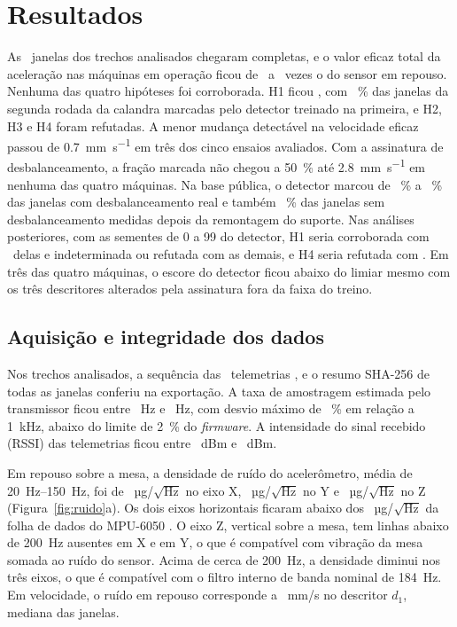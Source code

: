 \chapter{Resultados}\label{cap:resultados}

As \campoJanelas\ janelas dos trechos analisados chegaram completas, e o valor eficaz total da aceleração nas máquinas em operação ficou de \sinalRazaoMin\ a \sinalRazaoMax\ vezes o do sensor em repouso. Nenhuma das quatro hipóteses foi corroborada. H1 ficou \hUmVeredito, com \hUmFracaoCalandra~\% das janelas da segunda rodada da calandra marcadas pelo detector treinado na primeira, e H2, H3 e H4 foram refutadas. A menor mudança detectável na velocidade eficaz passou de \SI{0,7}{\milli\meter\per\second} em três dos cinco ensaios avaliados. Com a assinatura de desbalanceamento, a fração marcada não chegou a \SI{50}{\percent} até \SI{2,8}{\milli\meter\per\second} em nenhuma das quatro máquinas. Na base pública, o detector marcou de \hQuatroFracaoTres~\% a \hQuatroFracaoQuatro~\% das janelas com desbalanceamento real e também \hQuatroFracaoZero~\% das janelas sem desbalanceamento medidas depois da remontagem do suporte. Nas análises posteriores, com as sementes de 0 a \num{99} do detector, H1 seria corroborada com \apTresVereditoUmCorroborada\ delas e indeterminada ou refutada com as demais, e H4 seria refutada com \apTresVereditoQuatroRefutada. Em três das quatro máquinas, o escore do detector ficou abaixo do limiar mesmo com os três descritores alterados pela assinatura fora da faixa do treino.

\section{Aquisição e integridade dos dados}\label{sec:res-aquisicao}

Nos trechos analisados, a sequência das \campoLeituras\ telemetrias \campoLacunasTexto, e o resumo SHA-256 de todas as janelas conferiu na exportação. A taxa de amostragem estimada pelo transmissor ficou entre \campoTaxaMin~Hz e \campoTaxaMax~Hz, com desvio máximo de \campoDesvioTaxaMax~\% em relação a \SI{1}{\kilo\hertz}, abaixo do limite de \SI{2}{\percent} do \textit{firmware}. A intensidade do sinal recebido (RSSI) das telemetrias ficou entre \campoRssiMin~dBm e \campoRssiMax~dBm.

Em repouso sobre a mesa, a densidade de ruído do acelerômetro, média de \SIrange{20}{150}{\hertz}, foi de \ruidoDensidadeX~µg/$\sqrt{\text{Hz}}$ no eixo X, \ruidoDensidadeY~µg/$\sqrt{\text{Hz}}$ no Y e \ruidoDensidadeZ~µg/$\sqrt{\text{Hz}}$ no Z (Figura~\ref{fig:ruido}a). Os dois eixos horizontais ficaram abaixo dos \ruidoDatasheet~µg/$\sqrt{\text{Hz}}$ da folha de dados do MPU-6050 \cite{invensense2011ps}. O eixo Z, vertical sobre a mesa, tem linhas abaixo de \SI{200}{\hertz} ausentes em X e em Y, o que é compatível com vibração da mesa somada ao ruído do sensor. Acima de cerca de \SI{200}{\hertz}, a densidade diminui nos três eixos, o que é compatível com o filtro interno de banda nominal de \SI{184}{\hertz}. Em velocidade, o ruído em repouso corresponde a \ruidoVelocidade~mm/s no descritor $d_1$, mediana das janelas.

